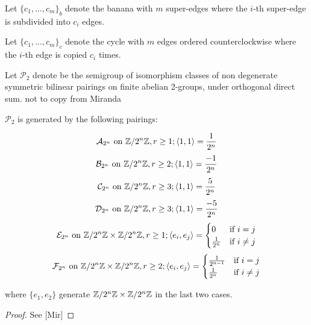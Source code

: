 \documentclass{amsart}
\begin{document}
 \begin{defn} Let $\{c_{1}, \dots, c_{m}\}_{b}$ denote the banana with
$m$ super-edges where the $i$-th super-edge is subdivided into $c_{i}$
edges.
 \end{defn}
 
 \begin{defn} Let $\{c_{1}, \dots, c_{m}\}_{c}$ denote the cycle with
$m$ edges ordered counterclockwise where the $i$-th edge is copied
$c_{i}$ times.
 \end{defn}

 \begin{defn} Let $\mathcal{P}_{2}$ denote be the semigroup of
isomorphism classes of non degenerate symmetric bilinear pairings on
finite abelian 2-groups, under orthogonal direct sum.  %
not to copy from Miranda
 \end{defn}

 \begin{prop} $\mathcal{P}_{2}$ is generated by the following
pairings:
  
   \[ \mathcal{A}_{2^{n}} \text{ on } \mathbb{Z}/2^{n}\mathbb{Z}, r\ge 1; \langle 1,
1\rangle=\frac{1}{2^{n}}
   \]
   \[ \mathcal{B}_{2^{n}} \text{ on } \mathbb{Z}/2^{n}\mathbb{Z}, r\ge 2; \langle 1,
1\rangle=\frac{-1}{2^{n}}
   \]
   \[ \mathcal{C}_{2^{n}} \text{ on } \mathbb{Z}/2^{n}\mathbb{Z}, r\ge 3; \langle 1,
1\rangle=\frac{5}{2^{n}}
   \]
   \[ \mathcal{D}_{2^{n}} \text{ on } \mathbb{Z}/2^{n}\mathbb{Z}, r\ge 3; \langle 1,
1\rangle=\frac{-5}{2^{n}}
   \]
   \[ \mathcal{E}_{2^{n}} \text{ on } \mathbb{Z}/2^{n}\mathbb{Z}\times\mathbb{Z}/2^{n}\mathbb{Z}, r\ge 1; \langle
e_{i}, e_{j}\rangle=\begin{cases}0&\mbox{if } i=j\\
\frac{1}{2^{n}}&\mbox{if } i\neq j\end{cases}
   \]
   \[ \mathcal{F}_{2^{n}} \text{ on } \mathbb{Z}/2^{n}\mathbb{Z}\times\mathbb{Z}/2^{n}\mathbb{Z}, r\ge 2; \langle
e_{i}, e_{j}\rangle=\begin{cases}\frac{1}{2^{n-1}}&\mbox{if } i=j\\
\frac{1}{2^{n}}&\mbox{if } i\neq j\end{cases}
   \]
   
where $\{e_{1}, e_{2}\}$ generate $\mathbb{Z}/2^{n}\mathbb{Z}\times\mathbb{Z}/2^{n}\mathbb{Z}$ in the
last two cases.
 \end{prop}
 \begin{proof} See [Mir]
 \end{proof}
 
\end{document}
